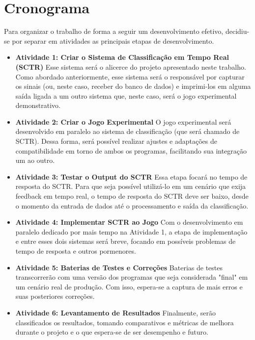 \chapter{Cronograma}
\label{cronograma}

Para organizar o trabalho de forma a seguir um desenvolvimento efetivo, decidiu-se por separar em atividades as principais etapas de desenvolvimento.

\begin{itemize}
    \item \textbf{Atividade 1: Criar o Sistema de Classificação em Tempo Real (SCTR)} Esse sistema será o alicerce do projeto apresentado neste trabalho. Como abordado anteriormente, esse sistema será o responsável por capturar os sinais (ou, neste caso, receber do banco de dados) e imprimi-los em alguma saída ligada a um outro sistema que, neste caso, será o jogo experimental demonstrativo.
    \item \textbf{Atividade 2: Criar o Jogo Experimental} O jogo experimental será desenvolvido em paralelo ao sistema de classificação (que será chamado de SCTR). Dessa forma, será possível realizar ajustes e adaptações de compatibilidade em torno de ambos os programas, facilitando sua integração um ao outro.
    \item \textbf{Atividade 3: Testar o Output do SCTR} Essa etapa focará no tempo de resposta do SCTR. Para que seja possível utilizá-lo em um cenário que exija feedback em tempo real, o tempo de resposta do SCTR deve ser baixo, desde o momento da entrada de dados até o processamento e saída da classificação.
    \item \textbf{Atividade 4: Implementar SCTR ao Jogo} Com o desenvolvimento em paralelo dedicado por mais tempo na Atividade 1, a etapa de implementação e entre esses dois sistemas será breve, focando em possíveis problemas de tempo de resposta e outros pormenores.
    \item \textbf{Atividade 5: Baterias de Testes e Correções} Baterias de testes transcorrerão com uma versão dos programas que seja considerada "final" em um cenário real de produção. Com isso, espera-se a captura de mais erros e suas posteriores correções.
    \item \textbf{Atividade 6: Levantamento de Resultados} Finalmente, serão classificados os resultados, tomando comparativos e métricas de melhora durante o projeto e o que espera-se de ser desempenho e futuro.
\end{itemize}

